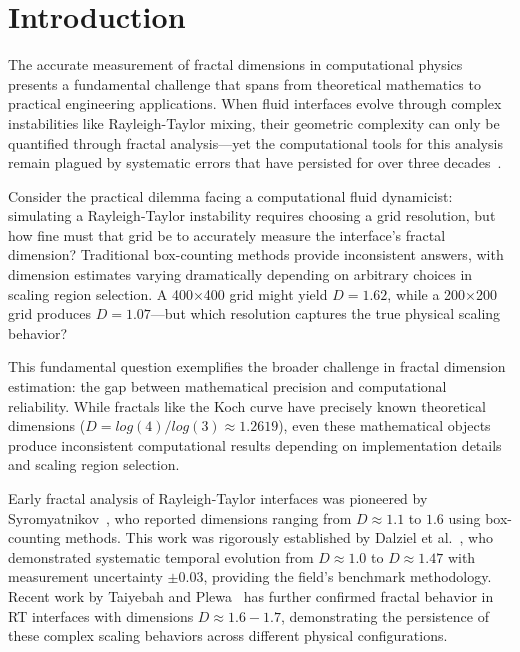 \documentclass[preprint,12pt]{elsarticle}
\def\log{log}%
\begin{document}

\section{Introduction}
\label{sec:introduction}

The accurate measurement of fractal dimensions in computational physics presents a fundamental challenge that spans from theoretical mathematics to practical engineering applications. When fluid interfaces evolve through complex instabilities like Rayleigh-Taylor mixing, their geometric complexity can only be quantified through fractal analysis—yet the computational tools for this analysis remain plagued by systematic errors that have persisted for over three decades~\cite{liebovitch1989,bouda2016}.

Consider the practical dilemma facing a computational fluid dynamicist: simulating a Rayleigh-Taylor instability requires choosing a grid resolution, but how fine must that grid be to accurately measure the interface's fractal dimension? Traditional box-counting methods provide inconsistent answers, with dimension estimates varying dramatically depending on arbitrary choices in scaling region selection. A 400×400 grid might yield $D = 1.62$, while a 200×200 grid produces $D = 1.07$—but which resolution captures the true physical scaling behavior?

This fundamental question exemplifies the broader challenge in fractal dimension estimation: the gap between mathematical precision and computational reliability. While fractals like the Koch curve have precisely known theoretical dimensions ($D = \log(4)/\log(3) \approx 1.2619$), even these mathematical objects produce inconsistent computational results depending on implementation details and scaling region selection.

Early fractal analysis of Rayleigh-Taylor interfaces was pioneered by Syromyatnikov~\cite{syromyatnikov1993}, who reported dimensions ranging from $D \approx 1.1$ to $1.6$ using box-counting methods. This work was rigorously established by Dalziel et al.~\cite{dalziel1999}, who demonstrated systematic temporal evolution from $D \approx 1.0$ to $D \approx 1.47$ with measurement uncertainty $\pm 0.03$, providing the field's benchmark methodology. Recent work by Taiyebah and Plewa~\cite{taiyebah2024}  has further confirmed fractal behavior in RT interfaces with dimensions $D \approx 1.6-1.7$, demonstrating the persistence of these complex scaling behaviors across different physical configurations.
\end{document}
